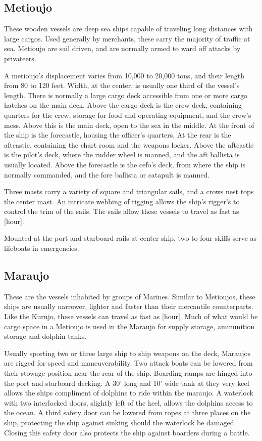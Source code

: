 \subsection{Metioujo}

These wooden vessels are deep sea ships capable of traveling long distances with large cargos. Used generally by merchants, these carry the majority of traffic at sea. Metioujo are sail driven, and are normally armed to ward off attacks by privateers.

A metioujo's displacement varies from 10,000 to 20,000 tons, and their length from 80 to 120 feet. Width, at the center, is usually one third of the vessel's length. There is normally a large cargo deck accessible from one or more cargo hatches on the main deck. Above the cargo deck is the crew deck, containing quarters for the crew, storage for food and operating equipment, and the crew's mess. Above this is the main deck, open to the sea in the middle. At the front of the ship is the forecastle, housing the officer's quarters. At the
rear is the aftcastle, containing the chart room and the weapons locker. Above the aftcastle is the pilot's deck, where the rudder wheel is manned, and the aft ballista is usually
located. Above the forecastle is the cefo's deck, from where the ship is normally commanded, and the fore ballista or catapult is manned.

Three masts carry a variety of square and triangular sails, and a crows nest tops the center mast. An intricate webbing of rigging allows the ship's rigger's to control the trim of the sails. The sails allow these vessels to travel as fast as [hour].

Mounted at the port and starboard rails at center ship, two to four skiffs serve as lifeboats in emergencies.
\subsection{Maraujo}
These are the vessels inhabited by groups of Marines. Similar to Metioujos, these ships are usually narrower, lighter and faster than their mercantile counterparts. Like the Kurujo, these vessels can travel as fast as [hour]. Much of what would be cargo space in a Metioujo is used in the Maraujo for supply storage, ammunition storage and dolphin tanks.

Usually sporting two or three large ship to ship weapons on the deck, Maraujos are rigged for speed and maneuverability. Two attack boats can be lowered from their stowage position near the rear of the ship. Boarding ramps are hinged into the port and starboard decking.
A 30' long and 10' wide tank at they very keel allows the ships compliment of dolphins to ride within the maraujo. A waterlock with two interlocked doors, slightly left of the keel, allows the dolphins access to the ocean. A third safety door can be lowered from ropes at three places on the ship, protecting the ship against sinking should the waterlock be damaged. Closing this safety door also protects the ship against boarders during a battle.

